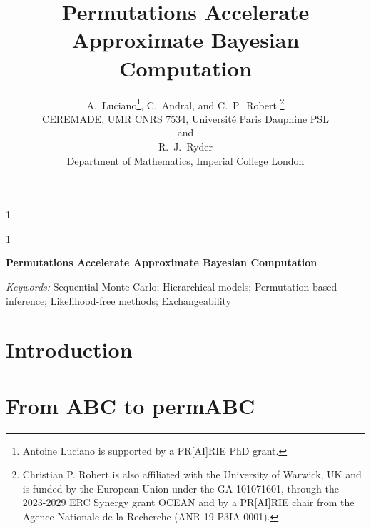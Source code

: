 \documentclass[12pt]{article}
\date{}
\theoremstyle{remark}
\theoremstyle{plain}
\newcommand{\anon}{1}
\begin{document}
\def\spacingset#1{\renewcommand{\baselinestretch}%
{#1}\small\normalsize} \spacingset{1}


\anon
{
  \title{\bf Permutations Accelerate Approximate Bayesian Computation}
  \author{
    A.~Luciano\thanks{
      Antoine Luciano is supported by a PR[AI]RIE PhD grant.},
    C.~Andral, and
    C.~P.~Robert \thanks{
      Christian P. Robert is also affiliated with the University of Warwick, UK and is funded by the European Union under the GA 101071601, through the 2023-2029 ERC Synergy grant OCEAN and by a PR[AI]RIE chair from the Agence Nationale de la Recherche (ANR-19-P3IA-0001).} \\
    CEREMADE, UMR CNRS 7534, Universit\'e Paris Dauphine PSL\\[6pt]
    and \\[6pt]
    R.~J.~Ryder \\
    Department of Mathematics, Imperial College London}
  \maketitle
} \fi

\anon
{
  \bigskip
  \bigskip
  \bigskip
  \begin{center}
    {\LARGE\bf Permutations Accelerate Approximate Bayesian Computation}
  \end{center}
  \medskip
} \fi

\bigskip
\begin{abstract}

\end{abstract}

\noindent%
{\it Keywords:}
Sequential Monte Carlo; Hierarchical models;
Permutation-based inference; Likelihood-free methods; Exchangeability
\vfill

\newpage
\spacingset{1.8} %



\section*{Introduction}


\section{From ABC to permABC}
\label{secabc_to_permabc}

\end{document}
